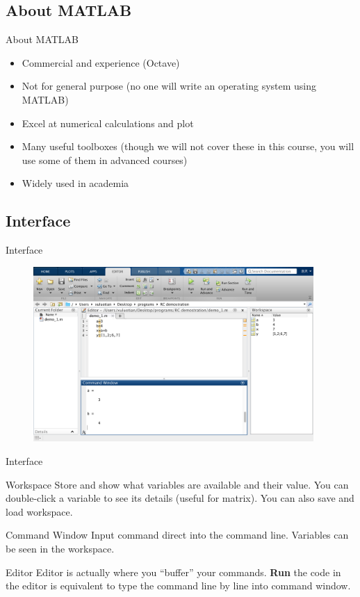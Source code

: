 \subsection{About MATLAB}
\begin{frame}{About MATLAB}
\begin{itemize}
\item Commercial and experience (Octave)
\item Not for general purpose (no one will write an operating system using MATLAB)
\item Excel at numerical calculations and plot
\item Many useful toolboxes (though we will not cover these in this course, you will use some of them in advanced courses)
\item Widely used in academia
\end{itemize}
\end{frame}

\subsection{Interface}
\begin{frame}{Interface}
\begin{figure}[htbp]
\centering
\includegraphics[width=0.95\textwidth]{pic/window.png}
\end{figure}
\end{frame}

\begin{frame}{Interface}
\begin{block}{Workspace}
Store and show what variables are available and their value. You can double-click a variable to see its details (useful for matrix). You can also save and load workspace.
\end{block}
\begin{block}{Command Window}
Input command direct into the command line. Variables can be seen in the workspace.
\end{block}
\begin{block}{Editor}
Editor is actually where you ``buffer'' your commands. \textbf{Run} the code in the editor is equivalent to type the command line by line into command window.
\end{block}
\end{frame}


